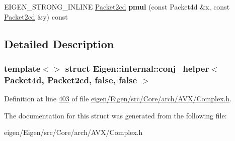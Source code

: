 \begin{DoxyCompactItemize}
\item 
\mbox{\label{struct_eigen_1_1internal_1_1conj__helper_3_01_packet4d_00_01_packet2cd_00_01false_00_01false_01_4_a377815e196ab154f2e465b945ffd5aea}} 
E\+I\+G\+E\+N\+\_\+\+S\+T\+R\+O\+N\+G\+\_\+\+I\+N\+L\+I\+NE \hyperlink{struct_eigen_1_1internal_1_1_packet2cd}{Packet2cd} {\bfseries pmul} (const Packet4d \&x, const \hyperlink{struct_eigen_1_1internal_1_1_packet2cd}{Packet2cd} \&y) const
\end{DoxyCompactItemize}


\subsection{Detailed Description}
\subsubsection*{template$<$$>$\newline
struct Eigen\+::internal\+::conj\+\_\+helper$<$ Packet4d, Packet2cd, false, false $>$}



Definition at line \hyperlink{eigen_2_eigen_2src_2_core_2arch_2_a_v_x_2_complex_8h_source_l00403}{403} of file \hyperlink{eigen_2_eigen_2src_2_core_2arch_2_a_v_x_2_complex_8h_source}{eigen/\+Eigen/src/\+Core/arch/\+A\+V\+X/\+Complex.\+h}.



The documentation for this struct was generated from the following file\+:\begin{DoxyCompactItemize}
\item 
eigen/\+Eigen/src/\+Core/arch/\+A\+V\+X/\+Complex.\+h\end{DoxyCompactItemize}
